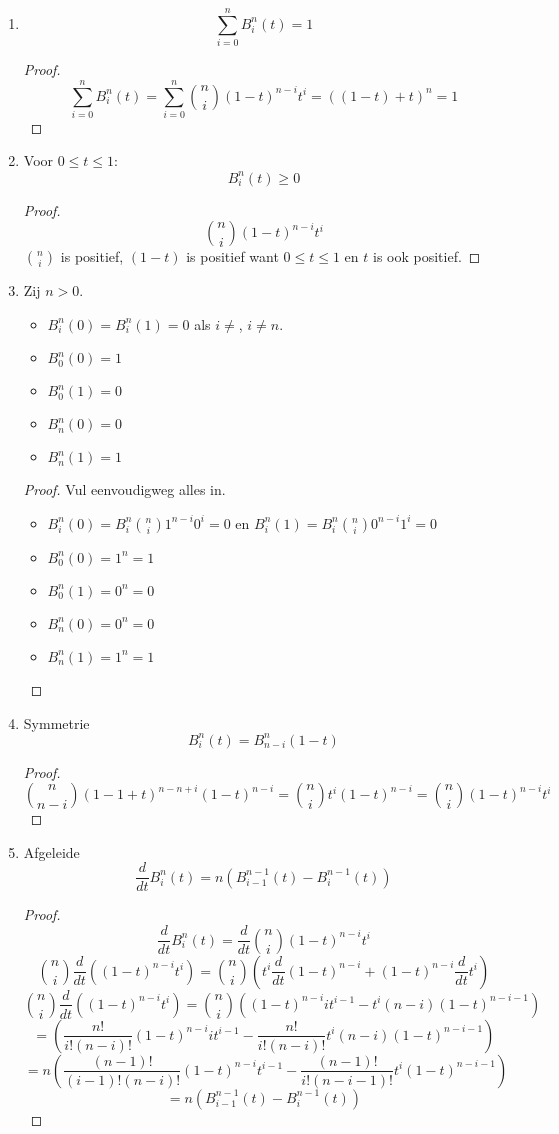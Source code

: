 \documentclass[tmi_notities.tex]{subfiles}
\begin{document}
\begin{enumerate}
\item
\[
\sum_{i=0}^nB_{i}^{n}(t) = 1
\]
\begin{proof}
\[
\sum_{i=0}^nB_{i}^{n}(t)
= \sum_{i=0}^{n}\binom{n}{i}(1-t)^{n-i}t^i
= ((1-t)+t)^n
= 1
\]
\end{proof}

\item
Voor $0 \le t \le 1$:
\[
B_{i}^{n}(t) \ge 0
\]
\begin{proof}
\[
\binom{n}{i}(1-t)^{n-i}t^{i}
\]
$\binom{n}{i}$ is positief, $(1-t)$ is positief want $0 \le t \le 1$ en $t$ is ook positief.
\end{proof}

\item Zij $n>0$.
\begin{itemize}
\item $B_{i}^{n}(0) = B_{i}^{n}(1) = 0$ als $i\neq$, $i\neq n$.
\item $B_{0}^{n}(0) = 1$
\item $B_{0}^{n}(1) = 0$
\item $B_{n}^{n}(0) = 0$
\item $B_{n}^{n}(1) = 1$
\end{itemize}
\begin{proof}
Vul eenvoudigweg alles in.
\begin{itemize}
\item $B_{i}^{n}(0) = B_{i}^{n}\binom{n}{i}1^{n-i}0^{i} = 0$ en $B_{i}^{n}(1) = B_{i}^{n}\binom{n}{i}0^{n-i}1^{i} = 0$
\item $B_{0}^{n}(0) = 1^{n} = 1$
\item $B_{0}^{n}(1) = 0^{n} = 0$

\item $B_{n}^{n}(0) = 0^{n} = 0$
\item $B_{n}^{n}(1) = 1^{n} = 1$
\end{itemize}
\end{proof}

\item Symmetrie
\[
B_{i}^{n}(t) = B_{n-i}^{n}(1-t)
\]
\begin{proof}
\[
\binom{n}{n-i}(1-1+t)^{n-n+i}(1-t)^{n-i}
= \binom{n}{i}t^{i}(1-t)^{n-i}
= \binom{n}{i}(1-t)^{n-i}t^{i} 
\]
\end{proof}

\item Afgeleide
\[
\frac{d}{dt}B_{i}^{n}(t) = n(B_{i-1}^{n-1}(t) - B_{i}^{n-1}(t))
\]
\begin{proof}
\[
\frac{d}{dt}B_{i}^{n}(t) = \frac{d}{dt}\binom{n}{i}(1-t)^{n-i}t^{i}
\]
\[
\binom{n}{i}\frac{d}{dt}\left((1-t)^{n-i}t^{i}\right)
= \binom{n}{i}
\left(
t^{i}\frac{d}{dt}(1-t)^{n-i}
+ (1-t)^{n-i}\frac{d}{dt}t^{i}
\right)
\]
\[
\binom{n}{i}\frac{d}{dt}\left((1-t)^{n-i}t^{i}\right)
= \binom{n}{i}
\left(
(1-t)^{n-i}it^{i-1}
-t^{i}(n-i)(1-t)^{n-i-1}
\right)
\]
\[
= 
\left(
\frac{n!}{i!(n-i)!}
(1-t)^{n-i}it^{i-1}
-
\frac{n!}{i!(n-i)!}
t^{i}(n-i)(1-t)^{n-i-1}
\right)
\]
\[
= 
n
\left(
\frac{(n-1)!}{(i-1)!(n-i)!}
(1-t)^{n-i}t^{i-1}
-
\frac{(n-1)!}{i!(n-i-1)!}
t^{i}(1-t)^{n-i-1}
\right)
\]
\[
 = n(B_{i-1}^{n-1}(t) - B_{i}^{n-1}(t))
\]
\end{proof}


\end{enumerate}
\end{document}

